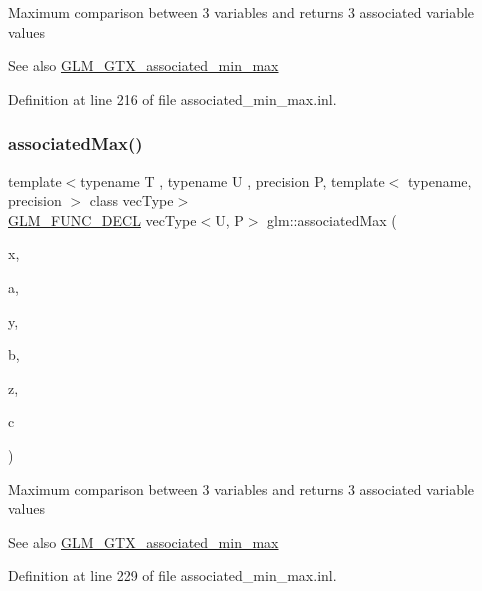 Maximum comparison between 3 variables and returns 3 associated variable values \begin{DoxySeeAlso}{See also}
\mbox{\hyperlink{group__gtx__associated__min__max}{G\+L\+M\+\_\+\+G\+T\+X\+\_\+associated\+\_\+min\+\_\+max}} 
\end{DoxySeeAlso}


Definition at line 216 of file associated\+\_\+min\+\_\+max.\+inl.

\mbox{\label{group__gtx__associated__min__max_ga065a0c1eb7837118ef79be88dfd78487}} 
\subsubsection{\texorpdfstring{associatedMax()}{associatedMax()}\hspace{0.1cm}{\footnotesize\ttfamily [6/12]}}
{\footnotesize\ttfamily template$<$typename T , typename U , precision P, template$<$ typename, precision $>$ class vec\+Type$>$ \\
\mbox{\hyperlink{setup_8hpp_ab2d052de21a70539923e9bcbf6e83a51}{G\+L\+M\+\_\+\+F\+U\+N\+C\+\_\+\+D\+E\+CL}} vec\+Type$<$U, P$>$ glm\+::associated\+Max (\begin{DoxyParamCaption}\item[{vec\+Type$<$ T, P $>$ const \&}]{x,  }\item[{vec\+Type$<$ U, P $>$ const \&}]{a,  }\item[{vec\+Type$<$ T, P $>$ const \&}]{y,  }\item[{vec\+Type$<$ U, P $>$ const \&}]{b,  }\item[{vec\+Type$<$ T, P $>$ const \&}]{z,  }\item[{vec\+Type$<$ U, P $>$ const \&}]{c }\end{DoxyParamCaption})}

Maximum comparison between 3 variables and returns 3 associated variable values \begin{DoxySeeAlso}{See also}
\mbox{\hyperlink{group__gtx__associated__min__max}{G\+L\+M\+\_\+\+G\+T\+X\+\_\+associated\+\_\+min\+\_\+max}} 
\end{DoxySeeAlso}


Definition at line 229 of file associated\+\_\+min\+\_\+max.\+inl.

